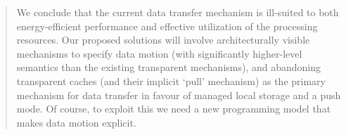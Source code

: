 \begin{quotation}
We conclude that the current data transfer mechanism is ill-suited
to both energy-efficient performance and effective utilization of the 
processing resources. 
Our proposed solutions will involve architecturally visible
mechanisms to specify data motion (with significantly higher-level 
semantics than the existing transparent mechanisms),  and
abandoning transparent caches (and their implicit `pull' mechanism) as the 
primary mechanism for data transfer in favour of managed local storage and a push mode. 
Of course, to exploit this we need a new programming model that makes
data motion explicit.
\end{quotation}

